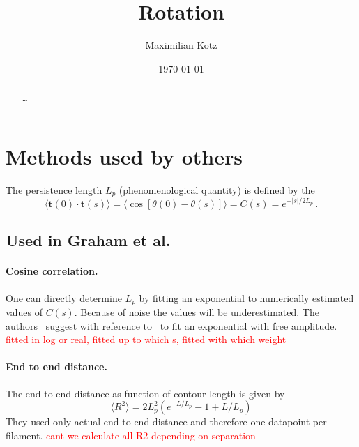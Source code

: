 \documentclass[twocolumn,aps,prxlife,longbibliography,amsmath,amssymb,floatfix,superscriptaddress,showkeys]{revtex4-2}
\newcommand{\red}[1]{\textcolor{red}{#1}}
\begin{document}
\title{Rotation}

\date{}
\author{Maximilian Kotz}


\date{\today}

\begin{abstract}
\dots
\end{abstract}

\maketitle

\section{Methods used by others}
The persistence length $L_p$ (phenomenological quantity) is defined by the
\begin{equation}
  \langle \bm{t}(0)\cdot\bm{t}(s) \rangle = \langle \cos\left[ \theta(0) - \theta(s) \right] \rangle = C(s) = e^{-|s|/2L_p} \, .
  \label{eq:def_lp}
\end{equation} 

\subsection{Used in Graham et al.~\cite{graham_multi-platform_2014}}
\paragraph{Cosine correlation.}
One can directly determine $L_p$ by fitting an exponential to numerically estimated values of $C(s)$. Because of noise the values will be underestimated.
The authors~\cite{graham_multi-platform_2014} suggest with reference to~\cite{isambert_flexibility_1995,gittes_flexural_1993} to fit an exponential with free amplitude.
\red{fitted in log or real, fitted up to which s, fitted with which weight}

\paragraph{End to end distance.} 
The end-to-end distance as function of contour length is given by~\cite{howard2001mechanics,landau1980statistical}
\begin{equation}
  \langle R^2 \rangle = 2L_p^2 \left( e^{-L/L_p} - 1 + L/L_p \right)
\end{equation}
They used only actual end-to-end distance and therefore one datapoint per filament.
\red{cant we calculate all R2 depending on separation}
\end{document}
